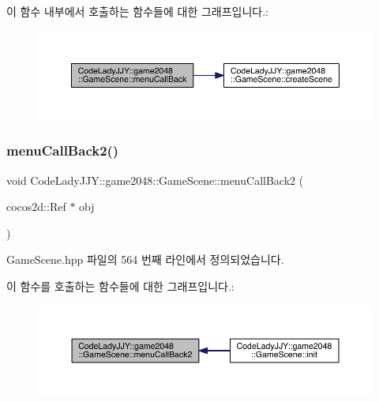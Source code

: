이 함수 내부에서 호출하는 함수들에 대한 그래프입니다.\+:
\nopagebreak
\begin{figure}[H]
\begin{center}
\leavevmode
\includegraphics[width=350pt]{class_code_lady_j_j_y_1_1game2048_1_1_game_scene_ac748b7487b72bc4722b7bbdb181e7267_cgraph}
\end{center}
\end{figure}
\mbox{\label{class_code_lady_j_j_y_1_1game2048_1_1_game_scene_a5fb8ef01d49e87cd898f4d9646dd3034}} 
\subsubsection{\texorpdfstring{menu\+Call\+Back2()}{menuCallBack2()}}
{\footnotesize\ttfamily void Code\+Lady\+J\+J\+Y\+::game2048\+::\+Game\+Scene\+::menu\+Call\+Back2 (\begin{DoxyParamCaption}\item[{cocos2d\+::\+Ref $\ast$}]{obj }\end{DoxyParamCaption})\hspace{0.3cm}{\ttfamily [inline]}}



Game\+Scene.\+hpp 파일의 564 번째 라인에서 정의되었습니다.

이 함수를 호출하는 함수들에 대한 그래프입니다.\+:
\nopagebreak
\begin{figure}[H]
\begin{center}
\leavevmode
\includegraphics[width=350pt]{class_code_lady_j_j_y_1_1game2048_1_1_game_scene_a5fb8ef01d49e87cd898f4d9646dd3034_icgraph}
\end{center}
\end{figure}
\mbox{\label{class_code_lady_j_j_y_1_1game2048_1_1_game_scene_ae674d90ff1c81818e308c99da876fbe8}} 
